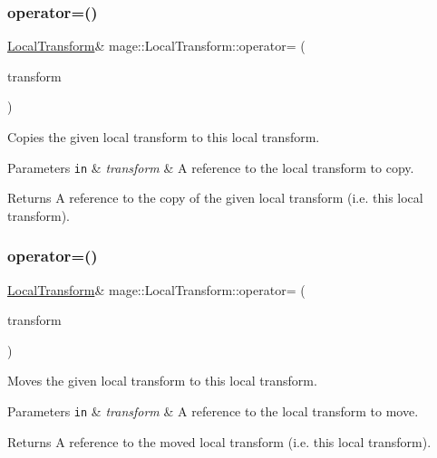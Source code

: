 \subsubsection{\texorpdfstring{operator=()}{operator=()}\hspace{0.1cm}{\footnotesize\ttfamily [1/2]}}
{\footnotesize\ttfamily \hyperlink{classmage_1_1_local_transform}{Local\+Transform}\& mage\+::\+Local\+Transform\+::operator= (\begin{DoxyParamCaption}\item[{const \hyperlink{classmage_1_1_local_transform}{Local\+Transform} \&}]{transform }\end{DoxyParamCaption})\hspace{0.3cm}{\ttfamily [default]}}

Copies the given local transform to this local transform.


\begin{DoxyParams}[1]{Parameters}
\mbox{\tt in}  & {\em transform} & A reference to the local transform to copy. \\
\hline
\end{DoxyParams}
\begin{DoxyReturn}{Returns}
A reference to the copy of the given local transform (i.\+e. this local transform). 
\end{DoxyReturn}
\hypertarget{classmage_1_1_local_transform_ae0e82157979f8ebfe4a207d53d0fbfbf}{}\label{classmage_1_1_local_transform_ae0e82157979f8ebfe4a207d53d0fbfbf} 
\subsubsection{\texorpdfstring{operator=()}{operator=()}\hspace{0.1cm}{\footnotesize\ttfamily [2/2]}}
{\footnotesize\ttfamily \hyperlink{classmage_1_1_local_transform}{Local\+Transform}\& mage\+::\+Local\+Transform\+::operator= (\begin{DoxyParamCaption}\item[{\hyperlink{classmage_1_1_local_transform}{Local\+Transform} \&\&}]{transform }\end{DoxyParamCaption})\hspace{0.3cm}{\ttfamily [default]}}

Moves the given local transform to this local transform.


\begin{DoxyParams}[1]{Parameters}
\mbox{\tt in}  & {\em transform} & A reference to the local transform to move. \\
\hline
\end{DoxyParams}
\begin{DoxyReturn}{Returns}
A reference to the moved local transform (i.\+e. this local transform). 
\end{DoxyReturn}
\hypertarget{classmage_1_1_local_transform_a7f6fbefa501a2111a07d532a823fba6e}{}\label{classmage_1_1_local_transform_a7f6fbefa501a2111a07d532a823fba6e} 
